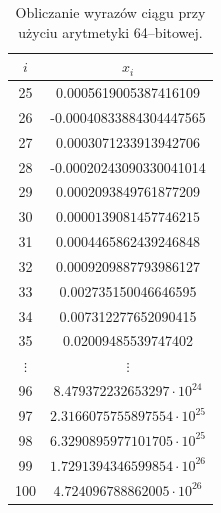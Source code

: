 \documentclass{article}
\begin{document}
\begin{table}[!h]
    \centering
    \begin{tabular}{|c|c|}
            \hline
             \(i\) & \(x_i\) \\
             \hline \hline
            25 &  0.0005619005387416109 \\
            26 &  -0.00040833884304447565 \\
            27 &  0.0003071233913942706 \\
            28 &  -0.00020243090330041014 \\
            29 &   0.0002093849761877209 \\
            30 &  \(0.0000139081457746215\) \\
            31 &  0.0004465862439246848 \\
            32 &  0.0009209887793986127 \\
            33 &  0.002735150046646595 \\
            34 &  0.007312277652090415 \\
            35 &  0.02009485539747402 \\
            \(\vdots\) &  \(\vdots\) \\
            96 &  \(8.479372232653297 \cdot 10^{24}\) \\
            97 &  \(2.3166075755897554 \cdot 10^{25}\) \\
            98 &  \(6.3290895977101705 \cdot 10^{25}\) \\
            99 &  \(1.7291394346599854 \cdot 10^{26}\) \\
            100 &  \(4.724096788862005 \cdot 10^{26}\) \\
            \hline
    \end{tabular}
    \caption{Obliczanie wyrazów ciągu przy użyciu arytmetyki 64--bitowej.}
    \label{tab:rek_64}
\end{table}



\newpage
\end{document}
